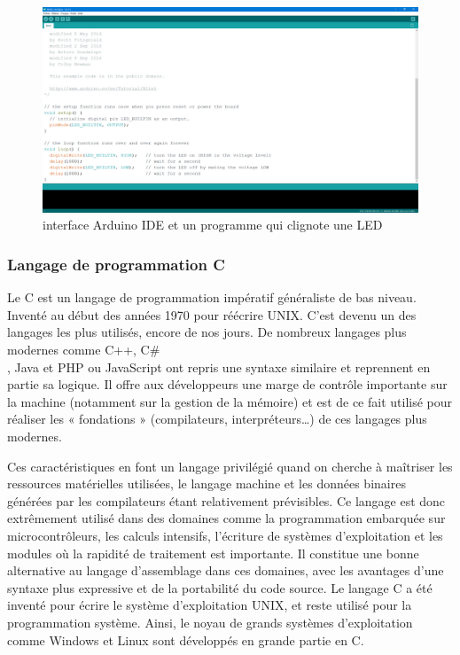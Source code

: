 \begin{figure}[h!]
    \centering
    \includegraphics[scale=0.3]{images/arduino_ide.PNG}
    \caption{interface Arduino IDE et un programme qui clignote une LED}
    \label{fig61}
\end{figure}

\subsubsection{Langage de programmation C}
Le C est un langage de programmation impératif généraliste de bas niveau. Inventé 
au début des années 1970 pour réécrire UNIX. C’est devenu un des langages les 
plus utilisés, encore de nos jours. De nombreux langages plus modernes comme 
C++, C\#\\, Java et PHP ou JavaScript ont repris une syntaxe similaire et 
reprennent en partie sa logique. Il offre aux développeurs une marge de contrôle 
importante sur la machine (notamment sur la gestion de la mémoire) et est de ce 
fait utilisé pour réaliser les « fondations » (compilateurs, interpréteurs…) de 
ces langages plus modernes.

Ces caractéristiques en font un langage privilégié quand on cherche à maîtriser 
les ressources matérielles utilisées, le langage machine et les données binaires 
générées par les compilateurs étant relativement prévisibles. Ce langage est 
donc extrêmement utilisé dans des domaines comme la programmation embarquée sur 
microcontrôleurs, les calculs intensifs, l’écriture de systèmes d’exploitation 
et les modules où la rapidité de traitement est importante. Il constitue une 
bonne alternative au langage d’assemblage dans ces domaines, avec les avantages 
d’une syntaxe plus expressive et de la portabilité du code source. Le langage C 
a été inventé pour écrire le système d’exploitation UNIX, et reste utilisé pour 
la programmation système. Ainsi, le noyau de grands systèmes d’exploitation comme 
Windows et Linux sont développés en grande partie en C.

